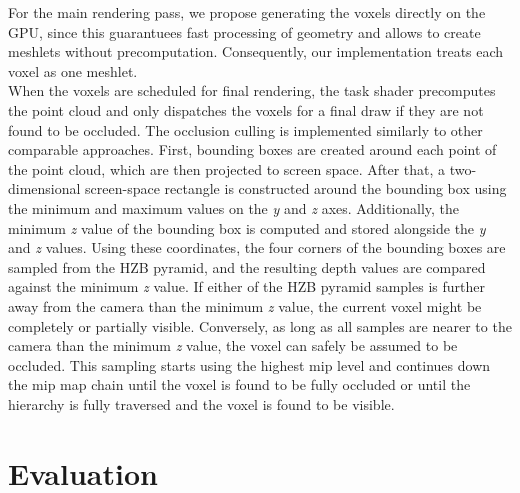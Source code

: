 \documentclass[conference]{IEEEtran}
\begin{document}
\noindent
For the main rendering pass, we propose generating the voxels directly on the \ac{GPU}, since this 
guarantuees fast processing of geometry and allows to create meshlets without precomputation.
Consequently, our implementation treats each voxel as one meshlet. \\

\noindent
When the voxels are scheduled for final rendering, the task shader precomputes the point cloud 
and only dispatches the voxels for a final draw if they are not found to be occluded. The occlusion 
culling is implemented similarly to other comparable approaches. First, bounding boxes are created 
around each point of the point cloud, which are then projected to screen space. After that, 
a two-dimensional screen-space rectangle is constructed around the bounding box using the minimum 
and maximum values on the \emph{y} and \emph{z} axes. Additionally, the minimum \emph{z} value of 
the bounding box is computed and stored alongside the \emph{y} and \emph{z} values. Using these 
coordinates, the four corners of the bounding boxes are sampled from the \ac{HZB} pyramid, and the 
resulting depth values are compared against the minimum \emph{z} value. If either of the 
\ac{HZB} pyramid samples is further away from the camera than the minimum \emph{z} value, the current 
voxel might be completely or partially visible. Conversely, as long as all samples are nearer to 
the camera than the minimum \emph{z} value, the voxel can safely be assumed to be occluded. This 
sampling starts using the highest mip level and continues down the mip map chain until the voxel is 
found to be fully occluded or until the hierarchy is fully traversed and the voxel is found to be 
visible. 

\section{Evaluation} \label{sec-evaluation}
\end{document}

